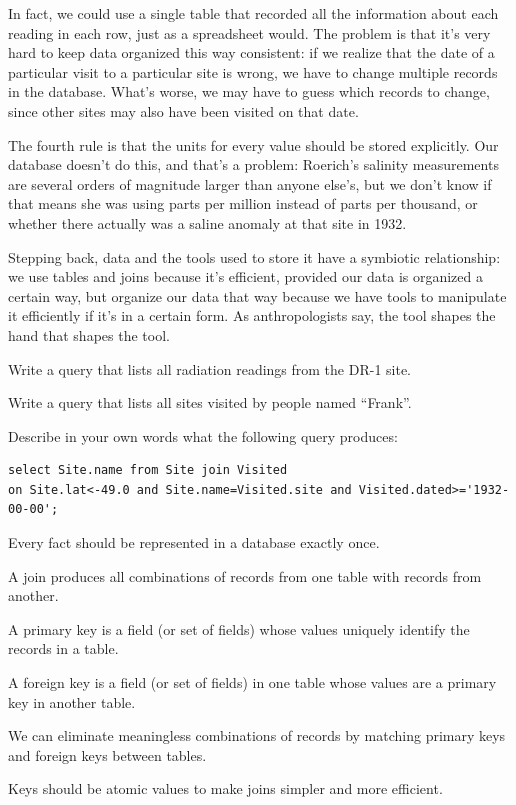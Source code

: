 \documentclass{book}
\begin{document}
In fact, we could use a single table that recorded all the information
about each reading in each row, just as a spreadsheet would. The problem
is that it's very hard to keep data organized this way consistent: if we
realize that the date of a particular visit to a particular site is
wrong, we have to change multiple records in the database. What's worse,
we may have to guess which records to change, since other sites may also
have been visited on that date.

The fourth rule is that the units for every value should be stored
explicitly. Our database doesn't do this, and that's a problem:
Roerich's salinity measurements are several orders of magnitude larger
than anyone else's, but we don't know if that means she was using parts
per million instead of parts per thousand, or whether there actually was
a saline anomaly at that site in 1932.

Stepping back, data and the tools used to store it have a symbiotic
relationship: we use tables and joins because it's efficient, provided
our data is organized a certain way, but organize our data that way
because we have tools to manipulate it efficiently if it's in a certain
form. As anthropologists say, the tool shapes the hand that shapes the
tool.

\begin{challenge}
  Write a query that lists all radiation readings from the DR-1 site.
\end{challenge}

\begin{challenge}
  Write a query that lists all sites visited by people named ``Frank''.
\end{challenge}

\begin{challenge}
  Describe in your own words what the following query produces:

\begin{verbatim}
select Site.name from Site join Visited
on Site.lat<-49.0 and Site.name=Visited.site and Visited.dated>='1932-00-00';
\end{verbatim}
\end{challenge}

\begin{keypoints}
\begin{swcitemize}
\item
  Every fact should be represented in a database exactly once.
\item
  A join produces all combinations of records from one table with
  records from another.
\item
  A primary key is a field (or set of fields) whose values uniquely
  identify the records in a table.
\item
  A foreign key is a field (or set of fields) in one table whose values
  are a primary key in another table.
\item
  We can eliminate meaningless combinations of records by matching
  primary keys and foreign keys between tables.
\item
  Keys should be atomic values to make joins simpler and more efficient.
\end{swcitemize}
\end{keypoints}
\end{document}
